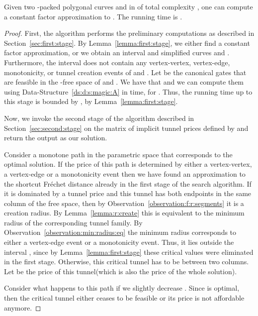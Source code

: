 \documentclass[12pt]{article}
\newcommand{\secref}[1]{Section~\ref{sec:#1}}
\newcommand{\lemlab}[1]{\label{lemma:#1}}
\newcommand{\lemref}[1]{Lemma~\ref{lemma:#1}}
\newcommand{\dsref}[1]{Data-Structure~\ref{ds:#1}}
\newcommand{\obsref}[1]{Observation~\ref{observation:#1}}
\newcommand{\Frechet}{Fr\'{e}c{h}e{}t\xspace}\providecommand{\Arr}{\mathop{\mathrm{\EuScript{A}}}}
\newcommand{\tunnel}{tunnel\xspace}
\numberwithin{figure}{section}
\numberwithin{equation}{section}
\begin{document}
\begin{lemma}\lemlab{rand:algo}Given two -packed polygonal curves  and  in
     of total complexity , one can compute a constant factor
    approximation to .  The running time
    is .
\end{lemma}

\begin{proof}
    First, the algorithm performs the preliminary computations as
    described in \secref{first:stage}. By \lemref{first:stage}, we
    either find a constant factor approximation, or we obtain an
    interval  and simplified curves  and
    . Furthermore, the interval  does not contain
    any vertex-vertex, vertex-edge, monotonicity, or tunnel creation
    events of  and .  Let  be the canonical gates
    that are feasible in the \mbox{-free} space of  and
    . We have that  and we can compute
    them using \dsref{d:s:magic:A} in  time, for
    .  Thus, the running time up to this stage is bounded by
    , by \lemref{first:stage}.
    
    Now, we invoke the second stage of the algorithm described in
    \secref{second:stage} on the matrix of implicit tunnel prices
    defined by  and return the output as our solution.
    
    Consider a monotone path in the parametric space that corresponds
    to the optimal solution. If the price of this path is determined
    by either a vertex-vertex, a vertex-edge or a monotonicity event
    then we have found an approximation to the shortcut \Frechet
    distance already in the first stage of the search algorithm.  If
    it is dominated by a tunnel price and this tunnel has both
    endpoints in the same column of the free space, then by
    \obsref{f:r:segments} it is a creation radius. By
    \lemref{r:create} this is equivalent to the minimum radius of the
    corresponding tunnel family. By \obsref{min:radius:eq} the minimum
    radius corresponds to either a vertex-edge event or a monotonicity
    event. Thus, it lies outside the interval , since
    by \lemref{first:stage} these critical values were eliminated in
    the first stage. Otherwise, this critical tunnel has to be between
    two columns.  Let  be the price of this \tunnel (which is
    also the price of the whole solution).
    
    Consider what happens to this path if we slightly decrease
    . Since  is optimal, then the critical tunnel
    either ceases to be feasible or its price is not affordable
    anymore.
    

\end{proof}
\end{document}
